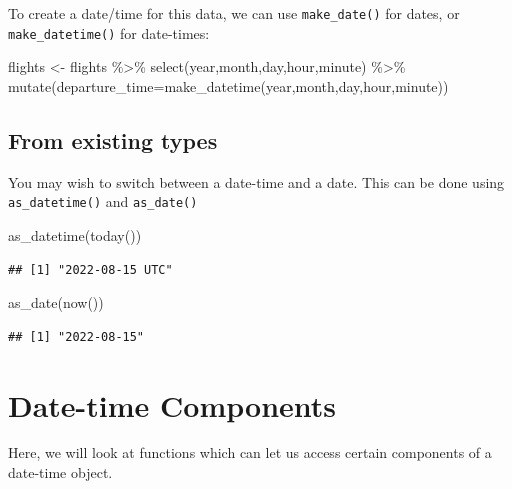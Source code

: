 \documentclass[
]{book}
\newenvironment{Shaded}{\begin{snugshade}}{\end{snugshade}}
\newcommand{\AttributeTok}[1]{\textcolor[rgb]{0.77,0.63,0.00}{#1}}
\newcommand{\FunctionTok}[1]{\textcolor[rgb]{0.00,0.00,0.00}{#1}}
\newcommand{\NormalTok}[1]{#1}
\newcommand{\OtherTok}[1]{\textcolor[rgb]{0.56,0.35,0.01}{#1}}
\newcommand{\SpecialCharTok}[1]{\textcolor[rgb]{0.00,0.00,0.00}{#1}}
\begin{document}
To create a date/time for this data, we can use \texttt{make\_date()} for dates, or \texttt{make\_datetime()} for date-times:

\begin{Shaded}
\begin{Highlighting}[]
\NormalTok{flights }\OtherTok{\textless{}{-}}\NormalTok{ flights }\SpecialCharTok{\%\textgreater{}\%}
  \FunctionTok{select}\NormalTok{(year,month,day,hour,minute) }\SpecialCharTok{\%\textgreater{}\%}
  \FunctionTok{mutate}\NormalTok{(}\AttributeTok{departure\_time=}\FunctionTok{make\_datetime}\NormalTok{(year,month,day,hour,minute))}
\end{Highlighting}
\end{Shaded}

\hypertarget{from-existing-types}{%
\subsection{From existing types}\label{from-existing-types}}

You may wish to switch between a date-time and a date. This can be done using \texttt{as\_datetime()} and \texttt{as\_date()}

\begin{Shaded}
\begin{Highlighting}[]
\FunctionTok{as\_datetime}\NormalTok{(}\FunctionTok{today}\NormalTok{())}
\end{Highlighting}
\end{Shaded}

\begin{verbatim}
## [1] "2022-08-15 UTC"
\end{verbatim}

\begin{Shaded}
\begin{Highlighting}[]
\FunctionTok{as\_date}\NormalTok{(}\FunctionTok{now}\NormalTok{())}
\end{Highlighting}
\end{Shaded}

\begin{verbatim}
## [1] "2022-08-15"
\end{verbatim}

\hypertarget{date-time-components}{%
\section{Date-time Components}\label{date-time-components}}

Here, we will look at functions which can let us access certain components of a date-time object.
\end{document}

